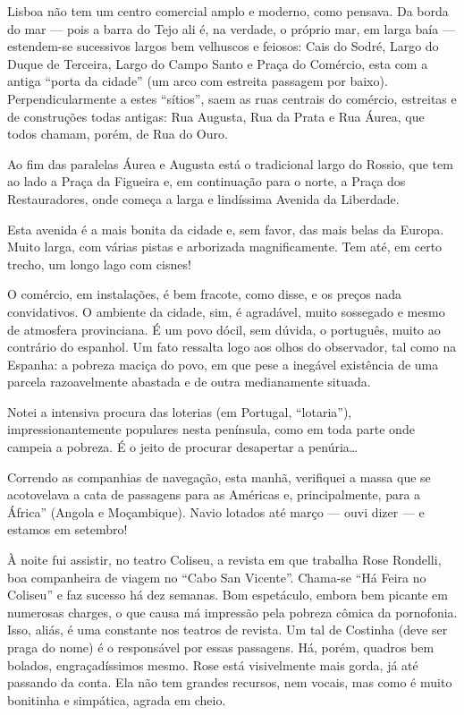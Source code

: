 Lisboa não tem um centro comercial amplo e moderno, como pensava. Da borda do mar --- pois a barra do Tejo ali é, na verdade, o próprio mar, em larga baía --- estendem-se sucessivos largos bem velhuscos e feiosos: Cais do Sodré, Largo do Duque de Terceira, Largo do Campo Santo e Praça do Comércio, esta com a antiga ``porta da cidade'' (um arco com estreita passagem por baixo). Perpendicularmente a estes ``sítios'', saem as ruas centrais do comércio, estreitas e de construções todas antigas: Rua Augusta, Rua da Prata e Rua Áurea, que todos chamam, porém, de Rua do Ouro.

Ao fim das paralelas Áurea e Augusta está o tradicional largo do Rossio, que tem ao lado a Praça da Figueira e, em continuação para o norte, a Praça dos Restauradores, onde começa a larga e lindíssima Avenida da Liberdade.

Esta avenida é a mais bonita da cidade e, sem favor, das mais belas da Europa. Muito larga, com várias pistas e arborizada magnificamente. Tem até, em certo trecho, um longo lago com cisnes!

O comércio, em instalações, é bem fracote, como disse, e os preços nada convidativos. O ambiente da cidade, sim, é agradável, muito sossegado e mesmo de atmosfera provinciana. É um povo dócil, sem dúvida, o português, muito ao contrário do espanhol. Um fato ressalta logo aos olhos do observador, tal como na Espanha: a pobreza maciça do povo, em que pese a inegável existência de uma parcela razoavelmente abastada e de outra medianamente situada.

Notei a intensiva procura das loterias (em Portugal, ``lotaria''), impressionantemente populares nesta península, como em toda parte onde campeia a pobreza. É o jeito de procurar desapertar a penúria\ldots

Correndo as companhias de navegação, esta manhã, verifiquei a massa que se acotovelava a cata de passagens para as Américas e, principalmente, para a África'' (Angola e Moçambique). Navio lotados até março --- ouvi dizer --- e estamos em setembro!

À noite fui assistir, no teatro Coliseu, a revista em que trabalha Rose Rondelli, boa companheira de viagem no ``Cabo San Vicente''. Chama-se ``Há Feira no Coliseu'' e faz sucesso há dez semanas. Bom espetáculo, embora bem picante em numerosas charges, o que causa má impressão pela pobreza cômica da pornofonia. Isso, aliás, é uma constante nos teatros de revista. Um tal de Costinha (deve ser praga do nome) é o responsável por essas passagens. Há, porém, quadros bem bolados, engraçadíssimos mesmo. Rose está visivelmente mais gorda, já até passando da conta. Ela não tem grandes recursos, nem vocais, mas como é muito bonitinha e simpática, agrada em cheio.

